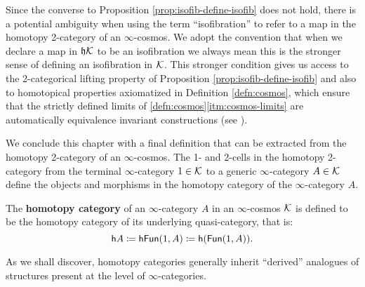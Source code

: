   \begin{con} Since the converse to Proposition \ref{prop:isofib-define-isofib} does not hold, there is a potential ambiguity when using the term ``isofibration'' to refer to a map in the homotopy 2-category of an $\infty$-cosmos. We adopt the convention that when we declare  a map in $\mathfrak{h}{\mathord{\mathcal{K}}}$ to be an isofibration we always mean this is the stronger sense of defining an isofibration in ${\mathord{\mathcal{K}}}$. This stronger condition gives us access to the 2-categorical lifting property of Proposition \ref{prop:isofib-define-isofib} and also to homotopical properties axiomatized in Definition \ref{defn:cosmos}, which ensure that the strictly defined limits of \ref{defn:cosmos}\ref{itm:cosmos-limits} are automatically equivalence invariant constructions (see \cite[6.2.8,\S C.1]{RiehlVerity:2022eo}). %
  \end{con}

  We conclude this chapter with a final definition that can be extracted from the homotopy 2-category of an $\infty$-cosmos. The 1- and 2-cells in the homotopy 2-category from the terminal $\infty$-category $1 \in {\mathord{\mathcal{K}}}$ to a generic $\infty$-category $A \in {\mathord{\mathcal{K}}}$ define the objects and morphisms in the homotopy category of the $\infty$-category $A$.

  \begin{defn}\label{defn:htpy-cat-of-infinity-cat} The \textbf{homotopy category} of an $\infty$-category $A$ in an $\infty$-cosmos ${\mathord{\mathcal{K}}}$ is defined to be the homotopy category of its underlying quasi-category, that is:
  \[ {\mathord{\mathsf{h}}} A \coloneq {\mathord{\mathsf{hFun}}}(1,A) \coloneq {\mathord{\mathsf{h}}}({\mathord{\mathsf{Fun}}}(1,A)).\]
  \end{defn}

  As we shall discover, homotopy categories generally inherit ``derived'' analogues of structures present at the level of $\infty$-categories. %
